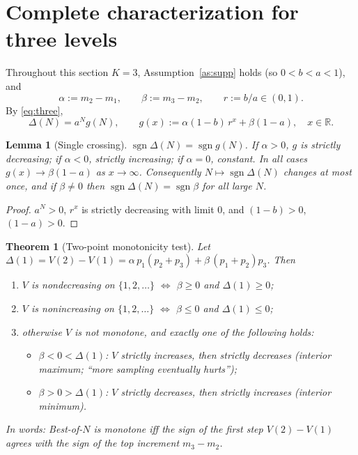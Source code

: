 \documentclass[11pt]{article}
\newtheorem{theorem}{Theorem}
\newtheorem{lemma}{Lemma}
\theoremstyle{definition}
\theoremstyle{remark}
\newcommand{\sgn}{\operatorname{sgn}}
\begin{document}
\section{Complete characterization for three levels}

Throughout this section $K=3$, Assumption~\ref{as:supp} holds (so $0<b<a<1$), and
\[
\alpha:=m_2-m_1,\qquad \beta:=m_3-m_2,\qquad r:=b/a\in(0,1).
\]
By \eqref{eq:three},
\begin{equation}\label{eq:g}
\Delta(N)=a^{N}g(N),\qquad g(x):=\alpha(1-b)\,r^{x}+\beta(1-a),\quad x\in\mathbb R .
\end{equation}

\begin{lemma}[Single crossing]\label{lem:sc}
$\sgn\Delta(N)=\sgn g(N)$. If $\alpha>0$, $g$ is strictly decreasing; if $\alpha<0$, strictly
increasing; if $\alpha=0$, constant. In all cases $g(x)\to\beta(1-a)$ as $x\to\infty$.
Consequently $N\mapsto\sgn\Delta(N)$ changes at most once, and if $\beta\neq 0$ then
$\sgn\Delta(N)=\sgn\beta$ for all large $N$.
\end{lemma}

\begin{proof}
$a^N>0$, $r^x$ is strictly decreasing with limit $0$, and $(1-b)>0$, $(1-a)>0$.
\end{proof}

\begin{theorem}[Two-point monotonicity test]\label{thm:two}
Let $\Delta(1)=V(2)-V(1)=\alpha\,p_1(p_2+p_3)+\beta\,(p_1+p_2)p_3$. Then
\begin{enumerate}[label=(\alph*)]
\item $V$ is nondecreasing on $\{1,2,\dots\}$ $\iff$ $\beta\ge 0$ and $\Delta(1)\ge 0$;
\item $V$ is nonincreasing on $\{1,2,\dots\}$ $\iff$ $\beta\le 0$ and $\Delta(1)\le 0$;
\item otherwise $V$ is not monotone, and exactly one of the following holds:
  \begin{itemize}
  \item $\beta<0<\Delta(1)$: $V$ strictly increases, then strictly decreases
        (interior maximum; ``more sampling eventually hurts'');
  \item $\beta>0>\Delta(1)$: $V$ strictly decreases, then strictly increases (interior minimum).
  \end{itemize}
\end{enumerate}
In words: Best-of-$N$ is monotone iff the sign of the first step $V(2)-V(1)$ agrees with the
sign of the top increment $m_3-m_2$.
\end{theorem}
\end{document}
